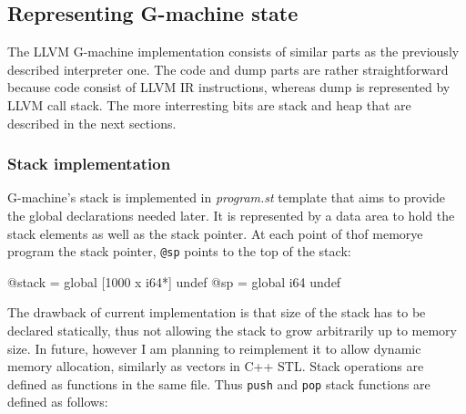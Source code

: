\documentclass[12pt,a4paper]{report}
\begin{document}
\subsection{Representing G-machine state}
The LLVM G-machine implementation consists of similar parts as the previously
described interpreter one. The code and dump parts are rather straightforward
because code consist of LLVM IR instructions, whereas dump is represented by
LLVM call stack. The more interresting bits are stack and heap that are
described in the next sections.

\subsubsection{Stack implementation}
G-machine's stack is implemented in \textit{program.st}
template that aims to provide the global declarations needed later. It is
represented by a data area to hold the stack elements as well as the stack
pointer. At each point of thof memorye program the stack pointer, \texttt{@sp} points to
the top of the stack:

\vspace*{0.2in}
\begin{code}[style=assembler]
@stack = global [1000 x i64*] undef
@sp = global i64 undef
\end{code}

The drawback of current implementation is that size of the stack has to be
declared statically, thus not allowing the stack to grow arbitrarily up to
memory size. In future, however I am planning to reimplement it to allow dynamic
memory allocation, similarly as vectors in C++ STL. Stack operations are
defined as functions in the same file. Thus \texttt{push} and \texttt{pop}
stack functions are defined as follows:

\vspace*{0.2in}
\end{document}
